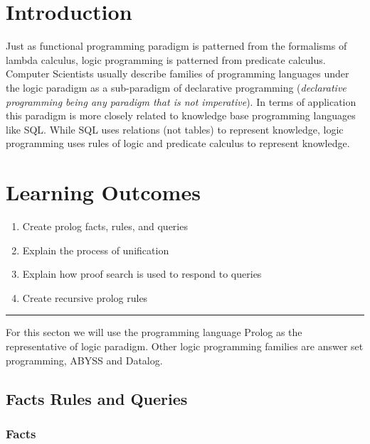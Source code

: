 \section{Introduction}\label{logic-programming-paradigm.md__introduction}

Just as functional programming paradigm is patterned from the formalisms
of lambda calculus, logic programming is patterned from predicate
calculus. Computer Scientists usually describe families of programming
languages under the logic paradigm as a sub-paradigm of declarative
programming (\emph{declarative programming being any paradigm that is
not imperative}). In terms of application this paradigm is more closely
related to knowledge base programming languages like SQL. While SQL uses
relations (not tables) to represent knowledge, logic programming uses
rules of logic and predicate calculus to represent knowledge.

\section{Learning
Outcomes}\label{logic-programming-paradigm.md__learning-outcomes}

\begin{enumerate}
\def\labelenumi{\arabic{enumi}.}
\tightlist
\item
  Create prolog facts, rules, and queries
\item
  Explain the process of unification
\item
  Explain how proof search is used to respond to queries
\item
  Create recursive prolog rules
\end{enumerate}

\begin{center}\rule{0.5\linewidth}{0.5pt}\end{center}

For this secton we will use the programming language Prolog as the
representative of logic paradigm. Other logic programming families are
answer set programming, ABYSS and Datalog.

\subsection{Facts Rules and
Queries}\label{logic-programming-paradigm.md__facts-rules-and-queries}

\subsubsection{Facts}\label{logic-programming-paradigm.md__facts}

